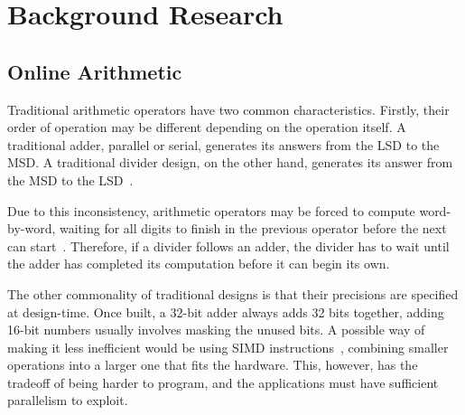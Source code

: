 \section{Background Research}

\subsection{Online Arithmetic}
Traditional arithmetic operators have two common characteristics.
Firstly, their order of operation may be different depending on the operation
itself.
A traditional adder, parallel or serial, generates its answers from the LSD to
the MSD.
A traditional divider design, on the other hand, generates its answer from
the MSD to the LSD~\cite{Brent1}\cite{Srinivas1}.

Due to this inconsistency, arithmetic operators may be forced to compute
word-by-word, waiting for all digits to finish in the previous operator before
the next can start~\cite{Zhao1}.
Therefore, if a divider follows an adder, the divider has to wait until the
adder has completed its computation before it can begin its own.

The other commonality of traditional designs is that their precisions are
specified at design-time.
Once built, a 32-bit adder always adds 32 bits together, adding 16-bit numbers
usually involves masking the unused bits.
A possible way of making it less inefficient would be using SIMD
instructions~\cite{Duncan1}, combining smaller operations into a larger
one that fits the hardware.
This, however, has the tradeoff of being harder to program, and the applications
must have sufficient parallelism to exploit.

